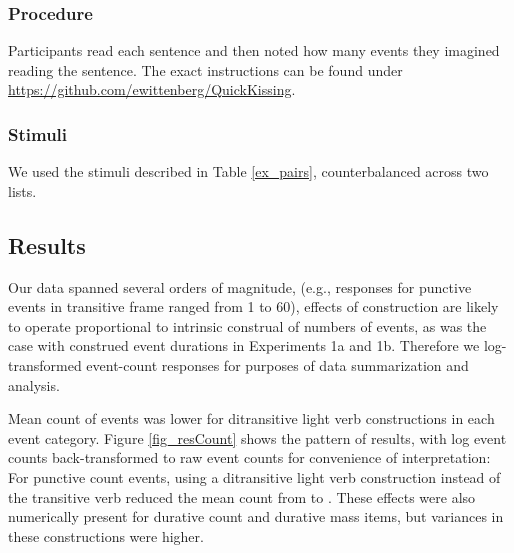 \documentclass[preprint,12pt,authoryear]{elsarticle}
\begin{document}
\subsubsection{Procedure}\label{sec_procHowMany}
Participants read each sentence and then noted how many events they imagined reading the sentence. The exact instructions can be found under \url{https://github.com/ewittenberg/QuickKissing}.

\subsubsection{Stimuli}\label{sec_stimHowMany}
We used the stimuli described in Table \ref{ex_pairs}, counterbalanced across two lists. 

\subsection{Results}\label{sec_resHowMany}
Our data spanned several orders of magnitude, (e.g., responses for punctive events in transitive frame ranged from 1 to 60), effects of construction are likely to operate proportional to intrinsic construal of numbers of events, as was the case with construed event durations in Experiments 1a and 1b.  Therefore we log-transformed event-count responses for purposes of data summarization and analysis. 

Mean count of events was lower for ditransitive light verb constructions in each event category. Figure \ref{fig_resCount}  shows the pattern of results, with log event counts back-transformed to raw event counts for convenience of interpretation: For punctive count events, using a ditransitive light verb construction instead of the transitive verb reduced the mean count from  to . These effects were also numerically present for durative count and durative mass items, but variances in these constructions were higher.
\end{document}

